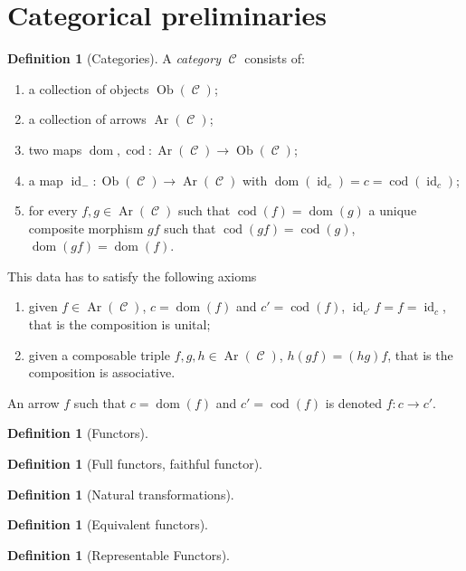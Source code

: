 \documentclass[a4paper,11pt,oneside,openany]{scrbook}
\DeclareMathOperator{\C}{\mathcal{C}}
\DeclareMathOperator{\id}{id}
\DeclareMathOperator{\dom}{dom}
\DeclareMathOperator{\cod}{cod}
\DeclareMathOperator{\Ob}{Ob}
\DeclareMathOperator{\Ar}{Ar}
\theoremstyle{definition}
\theoremstyle{definition}
\newtheorem{defn}[thm]{Definition} %
\begin{document}
	\mainmatter
	

	
	\chapter*{Categorical preliminaries}
	\begin{defn}[Categories]
		A \emph{category} $\C$ consists of:
		\begin{enumerate}
			\item a collection of objects $\Ob(\C)$;
			\item a collection of arrows $\Ar(\C)$;
			\item two maps $\dom,\cod\colon\Ar(\C)\rightarrow\Ob(\C)$;
			\item a map $\id_{-}\colon\Ob(\C)\rightarrow\Ar(\C)$ with $\dom(\id_{c})=c=\cod(\id_{c})$;
			\item for every $f,g\in\Ar(\C)$ such that $\cod(f)=\dom(g)$ a unique composite morphism $gf$ such that $\cod(gf)=\cod(g)$, $\dom(gf)=\dom(f)$.
		\end{enumerate}
	This data has to satisfy the following axioms
		\begin{enumerate}
			\item given $f\in\Ar(\C)$, $c=\dom(f)$ and $c'=\cod(f)$, $\id_{c'}f=f=\id_{c}$, that is the composition is unital;
			\item given a composable triple $f,g,h\in\Ar(\C)$, $h(gf)=(hg)f$, that is the composition is associative.
		\end{enumerate}
		An arrow $f$ such that $c=\dom(f)$ and $c'=\cod(f)$ is denoted $f\colon c\rightarrow c'$.
	\end{defn}
	
	\begin{defn}[Functors]
		
	\end{defn}
	
	\begin{defn}[Full functors, faithful functor]
		
	\end{defn}
	
	\begin{defn}[Natural transformations]
		
	\end{defn}
	
	\begin{defn}[Equivalent functors]
	\end{defn}
	
	\begin{defn}[Representable Functors]
		
	\end{defn}
	
\end{document}
